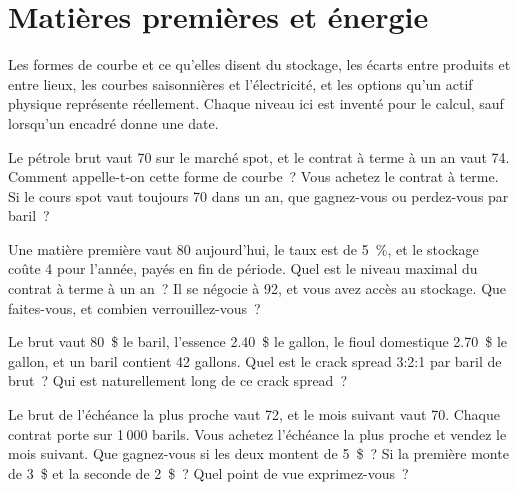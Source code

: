 \chapter{Matières premières et énergie}\label{ch:iv2:commodities-and-energy}

\begin{ivtrains}
Les formes de courbe et ce qu'elles disent du stockage, les écarts entre produits et entre lieux, les courbes saisonnières et l'électricité, et les options qu'un actif physique représente réellement. Chaque niveau ici est inventé pour le calcul, sauf lorsqu'un encadré donne une date.
\end{ivtrains}

\begin{question}\label{iq:iv2:commodities-and-energy:1}
Le pétrole brut vaut 70 sur le marché spot, et le contrat à terme à un an vaut 74. Comment appelle-t-on cette forme de courbe~? Vous achetez le contrat à terme. Si le cours spot vaut toujours 70 dans un an, que gagnez-vous ou perdez-vous par baril~?
\end{question}

\begin{question}\label{iq:iv2:commodities-and-energy:2}
Une matière première vaut 80 aujourd'hui, le taux est de 5~\%, et le stockage coûte 4 pour l'année, payés en fin de période. Quel est le niveau maximal du contrat à terme à un an~? Il se négocie à 92, et vous avez accès au stockage. Que faites-vous, et combien verrouillez-vous~?
\end{question}

\begin{question}\label{iq:iv2:commodities-and-energy:3}
Le brut vaut 80~\$ le baril, l'essence 2.40~\$ le gallon, le fioul domestique 2.70~\$ le gallon, et un baril contient 42 gallons. Quel est le crack spread 3:2:1 par baril de brut~? Qui est naturellement long de ce crack spread~?
\end{question}

\begin{question}\label{iq:iv2:commodities-and-energy:4}
Le brut de l'échéance la plus proche vaut 72, et le mois suivant vaut 70. Chaque contrat porte sur 1\,000 barils. Vous achetez l'échéance la plus proche et vendez le mois suivant. Que gagnez-vous si les deux montent de 5~\$~? Si la première monte de 3~\$ et la seconde de 2~\$~? Quel point de vue exprimez-vous~?
\end{question}

